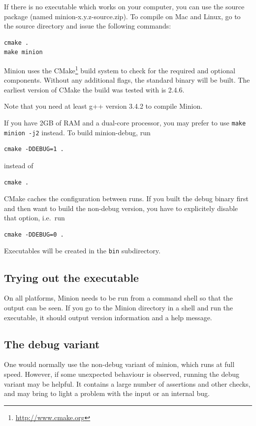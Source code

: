 \documentclass[oneside]{book}
\begin{document}
If there is no executable which works on your computer, you can use
the source package (named minion-x.y.z-source.zip). To compile on
Mac and Linux, go to the source directory and issue the following
commands:

\begin{verbatim}
cmake .
make minion
\end{verbatim}

Minion uses the CMake\footnote{\url{http://www.cmake.org}} build system to check
for the required and optional components. Without any additional flags, the
standard binary will be built. The earliest version of CMake the build was
tested with is 2.4.6.

Note that you need at least g++ version 3.4.2 to compile Minion.

If you have 2GB of RAM and a dual-core processor, you may prefer to
use \texttt{make minion -j2} instead. To build minion-debug, run
\begin{verbatim}
cmake -DDEBUG=1 .
\end{verbatim}
instead of
\begin{verbatim}
cmake .
\end{verbatim}
CMake caches the configuration between runs. If you built the debug binary first
and then want to build the non-debug version, you have to explicitely disable
that option, i.e.\ run
\begin{verbatim}
cmake -DDEBUG=0 .
\end{verbatim}

Executables will be created in the \texttt{bin} subdirectory.


\subsection{Trying out the executable}

On all platforms, Minion needs to be run from a command shell so that
the output can be seen. If you go to the Minion directory in a shell
and run the executable, it should output version information and a
help message. 


\subsection{The debug variant}

One would normally use the non-debug variant of minion, which runs
at full speed. However, if some unexpected behaviour is observed,
running the debug variant may be helpful. It contains a large number
of assertions and other checks, and may bring to light a problem with
the input or an internal bug.
\end{document}
